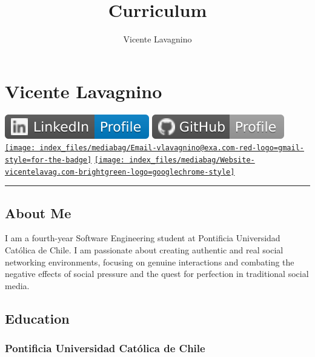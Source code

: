\documentclass[
]{article}
\title{Curriculum}
\subtitle{Vicente Lavagnino}
\author{}
\date{}
\begin{document}
\maketitle

\section{Vicente Lavagnino}\label{vicente-lavagnino}

\href{https://www.linkedin.com/in/vicentelavagnino/}{\includegraphics{index_files/mediabag/LinkedIn-Profile-blu.pdf}}
\href{https://github.com/vicentelavagnino}{\includegraphics{index_files/mediabag/GitHub-Profile-light.pdf}}
\href{mailto:vlavagnino@example.com}{\texttt{[image: index\_files/mediabag/Email-vlavagnino@exa.com-red-logo=gmail-style=for-the-badge]}}
\href{https://vicentelavagnino.com}{\texttt{[image: index\_files/mediabag/Website-vicentelavag.com-brightgreen-logo=googlechrome-style]}}

\begin{center}\rule{0.5\linewidth}{0.5pt}\end{center}

\subsection{About Me}\label{about-me}

I am a fourth-year Software Engineering student at Pontificia
Universidad Católica de Chile. I am passionate about creating authentic
and real social networking environments, focusing on genuine
interactions and combating the negative effects of social pressure and
the quest for perfection in traditional social media.

\subsection{Education}\label{education}

\subsubsection{Pontificia Universidad Católica de
Chile}\label{pontificia-universidad-catuxf3lica-de-chile}
\end{document}
